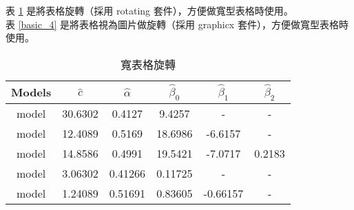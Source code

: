 表 \ref{ex07} 是將表格旋轉（採用 rotating 套件），方便做寬型表格時使用。\\
表 \ref{basic_4} 是將表格視為圖片做旋轉（採用  {\A graphicx} 套件），方便做寬型表格時使用。\\
\begin{minipage}{\textwidth}
        \begin{minipage}[t]{0.45\textwidth}
\begin{table}[H]
 \centering
 \caption{寬表格旋轉}\label{ex07}
 \smallskip
 \extrarowheight=2pt
\begin{sideways}
\begin{tabular}{cccccc} \toprule
Models  &  $\hat c$  &  $\hat\alpha$  &  $\hat\beta_0$  &  $\hat\beta_1$  &  $\hat\beta_2$  \\ \hline
model  & 30.6302  & 0.4127  & 9.4257  & - & -  \\
model  & 12.4089  & 0.5169  & 18.6986  & -6.6157  & - \\
model  & 14.8586  & 0.4991  & 19.5421  & -7.0717  & 0.2183 \\
model  & 3.06302  & 0.41266  & 0.11725  & - & - \\
model  & 1.24089  & 0.51691  & 0.83605  & -0.66157  & -  \\
\bottomrule
\end{tabular}
\end{sideways}
\end{table}
\end{minipage}
\begin{minipage}[t]{0.45\textwidth}
\begin{table}[H]
\begin{center}
\caption{旋轉表格}\label{basic_4}
\bigskip
\extrarowheight=2pt
\hspace{10pt}
\end{center}
\end{table}
\end{minipage}
\end{minipage}


